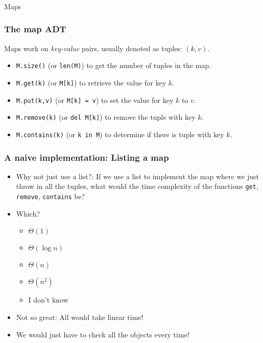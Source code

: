 \begin{frame}[fragile]\frametitle{}
\begin{center}
{\Large Maps}
\end{center}

\end{frame}

\begin{frame}
	\frametitle{The map ADT}
	
Maps work on \textit{key-value} pairs, usually denoted as tuples: $(k,v)$.
			
			\begin{itemize}
				\item \texttt{M.size()} (or \texttt{len(M)}) to get the number of tuples in the map.
					
				\item \texttt{M.get(k)} (or \texttt{M[k]}) to retrieve the value for key $k$.
				\item \texttt{M.put(k,v)} (or \texttt{M[k] = v}) to set the value for key $k$ to $v$.
					
				\item \texttt{M.remove(k)} (or \texttt{del M[k]}) to remove the tuple with key $k$.
					
				\item \texttt{M.contains(k)} (or \texttt{k in M}) to determine if there is tuple with key $k$.
			\end{itemize}

\end{frame}

\begin{frame}
	\frametitle{A naive implementation: Listing a map}

			\begin{itemize}
				\item Why not just use a list?: If we use a list to implement the map where we just throw in all the tuples, what would the time complexity
		of the functions \texttt{get}, \texttt{remove}, \texttt{contains} be?
						\item Which?
		\begin{itemize}
			\item $\Theta(1)$
			\item $\Theta(\log n)$
			\item $\Theta(n)$
			\item $\Theta(n^2)$
			\item I don't know
		\end{itemize}
		
				\item Not so great:		All would take linear time! 
 				\item We would just have to check all the objects every time!
	\end{itemize}
\end{frame}

